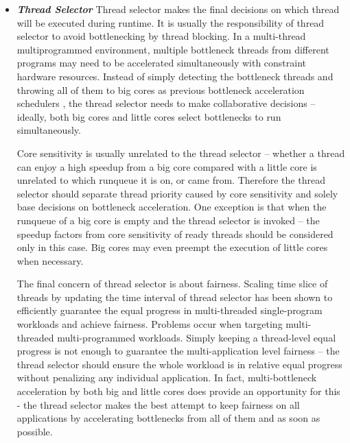 \documentclass{sig-alternate}
\begin{document}
\begin{itemize}
\item \textbf{\textit{Thread Selector}} Thread selector makes the final decisions on which thread will be executed during runtime. It is usually the responsibility of thread selector to avoid bottlenecking by thread blocking. In a multi-thread multiprogrammed environment, multiple bottleneck threads from different programs may need to be accelerated simultaneously with constraint hardware resources. Instead of simply detecting the bottleneck threads and throwing all of them to big cores as previous bottleneck acceleration schedulers \cite{jibaja2016portable,joao2013utility,joao2012bottleneck}, the thread selector needs to make collaborative decisions -- ideally, both big cores and little cores select bottlenecks to run simultaneously.

Core sensitivity is usually unrelated to the thread selector -- whether a thread can enjoy a high speedup from a big core compared with a little core is unrelated to which runqueue it is on, or came from. Therefore the thread selector should separate thread priority caused by core sensitivity and solely base decisions on bottleneck acceleration. One exception is that when the runqueue of a big core is empty and the thread selector is invoked -- the speedup factors from core sensitivity of ready threads should be considered only in this case. Big cores may even preempt the execution of little cores when necessary.  

The final concern of thread selector is about fairness. Scaling time slice of threads by updating the time interval of thread selector has been shown to efficiently guarantee the equal progress \cite{van2013fairness} in multi-threaded single-program workloads and achieve fairness. 
Problems occur when targeting multi-threaded multi-programmed workloads. Simply keeping a thread-level equal progress is not enough to guarantee the multi-application level fairness -- the thread selector should ensure the whole workload is in relative equal progress without penalizing any individual application. In fact,  multi-bottleneck acceleration by both big and little cores does provide an opportunity for this - the thread selector makes the best attempt to keep fairness on all applications by accelerating bottlenecks from all of them and as soon as possible.

\end{itemize}
\end{document}
